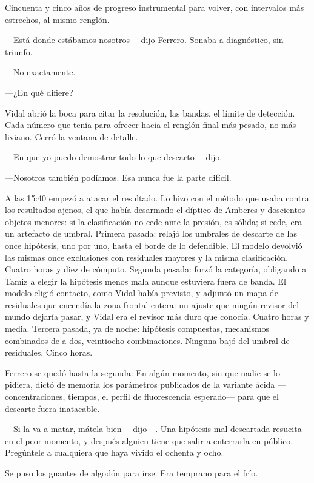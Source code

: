 Cincuenta y cinco años de progreso instrumental para volver, con intervalos más estrechos, al mismo renglón.

---Está donde estábamos nosotros ---dijo Ferrero. Sonaba a diagnóstico, sin triunfo.

---No exactamente.

---¿En qué difiere?

Vidal abrió la boca para citar la resolución, las bandas, el límite de detección. Cada número que tenía para ofrecer hacía el renglón final más pesado, no más liviano. Cerró la ventana de detalle.

---En que yo puedo demostrar todo lo que descarto ---dijo.

---Nosotros también podíamos. Esa nunca fue la parte difícil.

A las 15:40 empezó a atacar el resultado. Lo hizo con el método que usaba contra los resultados ajenos, el que había desarmado el díptico de Amberes y doscientos objetos menores: si la clasificación no cede ante la presión, es sólida; si cede, era un artefacto de umbral. Primera pasada: relajó los umbrales de descarte de las once hipótesis, uno por uno, hasta el borde de lo defendible. El modelo devolvió las mismas once exclusiones con residuales mayores y la misma clasificación. Cuatro horas y diez de cómputo. Segunda pasada: forzó la categoría, obligando a Tamiz a elegir la hipótesis menos mala aunque estuviera fuera de banda. El modelo eligió contacto, como Vidal había previsto, y adjuntó un mapa de residuales que encendía la zona frontal entera: un ajuste que ningún revisor del mundo dejaría pasar, y Vidal era el revisor más duro que conocía. Cuatro horas y media. Tercera pasada, ya de noche: hipótesis compuestas, mecanismos combinados de a dos, veintiocho combinaciones. Ninguna bajó del umbral de residuales. Cinco horas.

Ferrero se quedó hasta la segunda. En algún momento, sin que nadie se lo pidiera, dictó de memoria los parámetros publicados de la variante ácida ---concentraciones, tiempos, el perfil de fluorescencia esperado--- para que el descarte fuera inatacable.

---Si la va a matar, mátela bien ---dijo---. Una hipótesis mal descartada resucita en el peor momento, y después alguien tiene que salir a enterrarla en público. Pregúntele a cualquiera que haya vivido el ochenta y ocho.

Se puso los guantes de algodón para irse. Era temprano para el frío.

